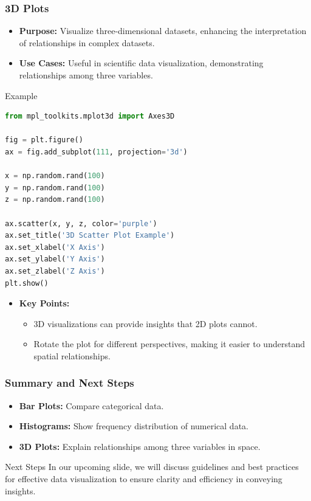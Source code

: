 \documentclass{beamer}
\begin{document}
\begin{frame}[fragile]
    \frametitle{3D Plots}
    \begin{itemize}
        \item \textbf{Purpose:} Visualize three-dimensional datasets, enhancing the interpretation of relationships in complex datasets.
        \item \textbf{Use Cases:} Useful in scientific data visualization, demonstrating relationships among three variables.
    \end{itemize}
    
    \begin{block}{Example}
        \begin{lstlisting}[language=Python]
from mpl_toolkits.mplot3d import Axes3D

fig = plt.figure()
ax = fig.add_subplot(111, projection='3d')

x = np.random.rand(100)
y = np.random.rand(100)
z = np.random.rand(100)

ax.scatter(x, y, z, color='purple')
ax.set_title('3D Scatter Plot Example')
ax.set_xlabel('X Axis')
ax.set_ylabel('Y Axis')
ax.set_zlabel('Z Axis')
plt.show()
        \end{lstlisting}
    \end{block}
    
    \begin{itemize}
        \item \textbf{Key Points:}
        \begin{itemize}
            \item 3D visualizations can provide insights that 2D plots cannot.
            \item Rotate the plot for different perspectives, making it easier to understand spatial relationships.
        \end{itemize}
    \end{itemize}
\end{frame}

\begin{frame}
    \frametitle{Summary and Next Steps}
    \begin{itemize}
        \item \textbf{Bar Plots:} Compare categorical data.
        \item \textbf{Histograms:} Show frequency distribution of numerical data.
        \item \textbf{3D Plots:} Explain relationships among three variables in space.
    \end{itemize}
    
    \begin{block}{Next Steps}
        In our upcoming slide, we will discuss guidelines and best practices for effective data visualization to ensure clarity and efficiency in conveying insights.
    \end{block}
\end{frame}
\end{document}
